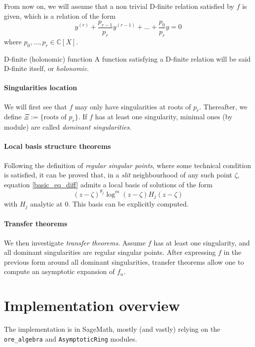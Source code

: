 \documentclass[../main.tex]{subfiles}
\begin{document}
From now on, we will assume that a non trivial D-finite relation satisfied by $f$ is given, which is a relation of the form
\begin{equation}\label{basic_eq_diff}
y^{(r)} + \frac{p_{r-1}}{p_r} y^{(r - 1)} + \dots + \frac{p_0}{p_r} y = 0
\end{equation}
where $p_0, \dots, p_r \in \mathbb{C}[X]$.

\begin{definition}{D-finite (holonomic) function}
	A function satisfying a D-finite relation will be said D-finite itself, or \emph{holonomic}.
\end{definition}

\paragraph*{Singularities location}
We will first see that $f$ may only have singularities at roots of $p_r$. Thereafter, we define $\Xi := \{ \text{roots of } p_r\}$. If $f$ has at least one singularity, minimal ones (by module) are called \emph{dominant singularities}.

\paragraph*{Local basis structure theorems}
Following the definition of \emph{regular singular points}, where some technical condition is satisfied, it can be proved that, in a \emph{slit} neighbourhood of any such point $\zeta$, equation \eqref{basic_eq_diff} admits a local basis of solutions of the form $${(z - \zeta)}^{\theta_j} \log^m (z - \zeta) H_j (z - \zeta)$$ with $H_j$ analytic at 0. This basis can be explicitly computed. 

\paragraph*{Transfer theorems}
We then investigate \emph{transfer theorems}. Assume $f$ has at least one singularity, and  all dominant singularities are regular singular points. After expressing $f$ in the previous form around all dominant singularities, transfer theorems allow one to compute an asymptotic expansion of $f_n$.


\section{Implementation overview}

The implementation is in SageMath, mostly (and vastly) relying on the \verb|ore_algebra| and \verb|AsymptoticRing| modules.
\end{document}
